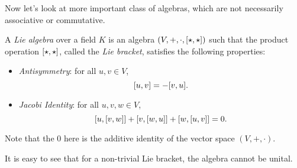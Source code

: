 Now let's look at more important class of algebras, which are not necessarily associative or commutative.
\begin{definition}
    A \emph{Lie algebra} over a field \(K\) is an algebra \((V, +, \cdot, \comm{\star}{\star})\) such that the product operation \(\comm{\star}{\star}\), called the \emph{Lie bracket}, satisfies the following properties:
    \begin{itemize}
        \item \emph{Antisymmetry}: for all \(u, v \in V\),
              \begin{equation}
                  \comm{u}{v} = -\comm{v}{u}.
              \end{equation}
        \item \emph{Jacobi Identity}: for all \(u, v, w \in V\),
              \begin{equation}
                  \comm{u}{\comm{v}{w}} + \comm{v}{\comm{w}{u}} + \comm{w}{\comm{u}{v}} = 0.
              \end{equation}
    \end{itemize}
    Note that the \(0\) here is the additive identity of the vector space \((V, +, \cdot)\).
\end{definition}
It is easy to see that for a non-trivial Lie bracket, the algebra cannot be unital.

